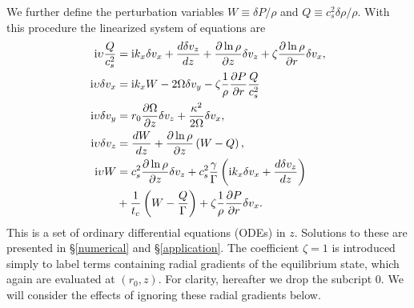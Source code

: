 We further define the perturbation variables  $W \equiv \delta P /\rho$ 
and $Q \equiv c_s^2\delta\rho/\rho$.  With this procedure the linearized
system of equations are
\begin{align}
  \mathrm{i}\upsilon \frac{Q}{c_s^2}  &=  \mathrm{i} k_x \delta v_x + \frac{d\delta
    v_z}{dz} + \frac{\partial\ln{\rho}}{\partial z}\delta v_z + \zeta
  \frac{\partial\ln{\rho}}{\partial r} \delta v_x,\label{lin_mass}\\
  \mathrm{i}\upsilon \delta v_x  &= \mathrm{i} k_x W - 2\Omega\delta v_y -
  \zeta\frac{1}{\rho}\frac{\partial P}{\partial r}\frac{Q}{c_s^2}\label{lin_vx}\\
   \mathrm{i} \upsilon\delta v_y &= r_0\frac{\partial \Omega}{\partial z}\delta v_z +
  \frac{\kappa^2}{2\Omega}\delta v_x, \label{lin_vy}\\
   \mathrm{i}\upsilon\delta v_z &= \frac{dW}{dz} +
  \frac{\partial\ln{\rho}}{\partial z}\left(W-Q\right), \label{lin_vz}\\
  \mathrm{i} \upsilon W &= c_s^2\frac{\partial\ln{\rho}}{\partial z}\delta v_z +
  c_s^2\frac{\gamma}{\Gamma} \left(\mathrm{i} k_x\delta v_x + \frac{d\delta
      v_z}{dz}\right) \notag\\
  &+ \frac{1}{t_c}\left(W - \frac{Q}{\Gamma}\right) +
  \zeta\frac{1}{\rho}\frac{\partial P}{\partial r}\delta v_x.\label{lin_energy}
\end{align}
This is a set of ordinary differential equations (ODEs) in
$z$.  %
Solutions to these 
are presented in \S\ref{numerical} and \S\ref{application}.   The coefficient $ \zeta = 1$ is 
introduced simply to label terms containing radial gradients of the equilibrium state, 
which again are evaluated at $(r_0, z)$. For clarity, hereafter we drop the subcript $0$.    
We will consider the effects of ignoring these radial gradients below. 



